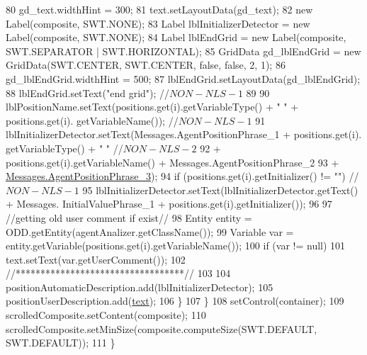 \begin{DoxyCode}
80                 gd\_text.widthHint = 300;
81                 text.setLayoutData(gd\_text);
82                 \textcolor{keyword}{new} Label(composite, SWT.NONE);         
83                 Label lblInitializerDetector = \textcolor{keyword}{new} Label(composite, SWT.NONE);
84                 Label lblEndGrid = \textcolor{keyword}{new} Label(composite, SWT.SEPARATOR | SWT.HORIZONTAL);
85                 GridData gd\_lblEndGrid = \textcolor{keyword}{new} GridData(SWT.CENTER, SWT.CENTER, \textcolor{keyword}{false}, \textcolor{keyword}{false}, 2, 1);
86                 gd\_lblEndGrid.widthHint = 500;
87                 lblEndGrid.setLayoutData(gd\_lblEndGrid);
88                 lblEndGrid.setText(\textcolor{stringliteral}{"end grid"}); \textcolor{comment}{//$NON-NLS-1$}
89                 
90                 lblPositionName.setText(positions.get(i).getVariableType() + \textcolor{stringliteral}{" "} + positions.get(i).
      getVariableName());  \textcolor{comment}{//$NON-NLS-1$}
91                 lblInitializerDetector.setText(Messages.AgentPositionPhrase\_1 + positions.get(i).
      getVariableType() + \textcolor{stringliteral}{" "}  \textcolor{comment}{//$NON-NLS-2$}
92                                         + positions.get(i).getVariableName() +
      Messages.AgentPositionPhrase\_2
93                                         + \hyperlink{classit_1_1isislab_1_1masonhelperdocumentation_1_1mason_1_1wizards_1_1_messages_a71ecf184dba867ae350d6ca94c4ddc6b}{Messages.AgentPositionPhrase\_3});    
94                 \textcolor{keywordflow}{if} (positions.get(i).getInitializer() != \textcolor{stringliteral}{""})     \textcolor{comment}{//$NON-NLS-1$}
95                     lblInitializerDetector.setText(lblInitializerDetector.getText() + Messages.
      InitialValuePhrase\_1 + positions.get(i).getInitializer());
96                 
97                 \textcolor{comment}{//getting old user comment if exist//}
98                 Entity entity = ODD.getEntity(agentAnalizer.getClassName());
99                 Variable var = entity.getVariable(positions.get(i).getVariableName());
100                 \textcolor{keywordflow}{if} (var != null)
101                     text.setText(var.getUserComment());
102                 \textcolor{comment}{//**********************************//}
103                 
104                 positionAutomaticDescription.add(lblInitializerDetector);
105                 positionUserDescription.add(\hyperlink{classit_1_1isislab_1_1masonhelperdocumentation_1_1mason_1_1wizards_1_1_e___agent_position_page_af6426f8de0e43846a74703addf28a63a}{text});
106             \}
107         \}
108         setControl(container);
109         scrolledComposite.setContent(composite);
110         scrolledComposite.setMinSize(composite.computeSize(SWT.DEFAULT, SWT.DEFAULT));
111     \}
\end{DoxyCode}
